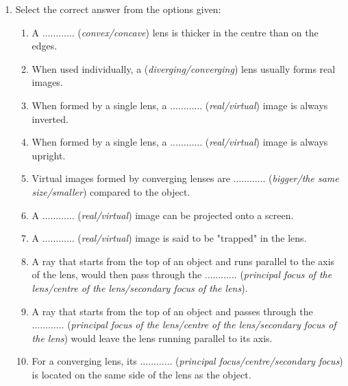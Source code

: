 \begin{eocexercises}{}
\begin{enumerate}
\item{Select the correct answer from the options given:
\begin{enumerate}
\item A $\ldots\ldots\ldots\ldots$ (\textit{convex/concave}) lens is thicker in the centre than on the edges.
\item When used individually, a (\textit{diverging/converging}) lens usually forms real images.
\item When formed by a single lens, a $\ldots\ldots\ldots\ldots$ (\textit{real/virtual}) image is always inverted.
\item When formed by a single lens, a $\ldots\ldots\ldots\ldots$ (\textit{real/virtual}) image is always upright.
\item Virtual images formed by converging lenses are $\ldots\ldots\ldots\ldots$ (\textit{bigger/the same size/smaller}) compared to the object.
\item A $\ldots\ldots\ldots\ldots$ (\textit{real/virtual}) image can be projected onto a screen.
\item A $\ldots\ldots\ldots\ldots$ (\textit{real/virtual}) image is said to be "trapped" in the lens.
\item A ray that starts from the top of an object and runs parallel to the axis of the lens, would then pass through the $\ldots\ldots\ldots\ldots$ (\textit{principal focus of the lens/centre of the lens/secondary focus of the lens}).
\item A ray that starts from the top of an object and passes through the $\ldots\ldots\ldots\ldots$ (\textit{principal focus of the lens/centre of the lens/secondary focus of the lens}) would leave the lens running parallel to its axis.
\item For a converging lens, its $\ldots\ldots\ldots\ldots$ (\textit{principal focus/centre/secondary focus}) is located on the same side of the lens as the object.

\end{enumerate}}
\end{enumerate}
\end{eocexercises}
